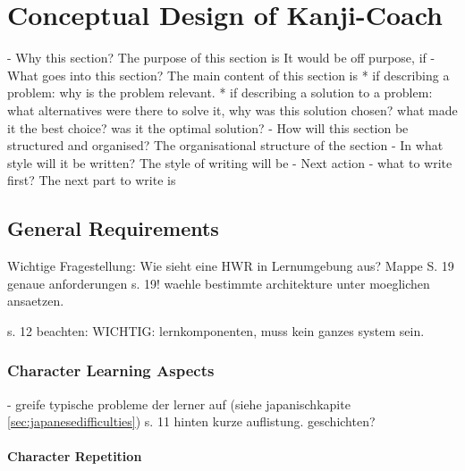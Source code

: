 
\chapter{Conceptual Design of Kanji-Coach}
\label{chap:conceptualdesignofkanjicoach}

- Why this section? 
  The purpose of this section is 
  It would be off purpose, if 
- What goes into this section?
  The main content of this section is 
  * if describing a problem: why is the problem relevant.
  * if describing a solution to a problem: what alternatives were
    there to solve it, why was this solution chosen? 
    what made it the best choice? was it the optimal solution?
- How will this section be structured and organised?
  The organisational structure of the section 
- In what style will it be written?
  The style of writing will be 
- Next action - what to write first?
  The next part to write is


\section{General Requirements}
\label{sec:concept:generalrequirements}

Wichtige Fragestellung: Wie sieht eine HWR in Lernumgebung aus?
Mappe S. 19
genaue anforderungen s. 19!
waehle bestimmte architekture unter moeglichen ansaetzen.

s. 12 beachten: WICHTIG: lernkomponenten, muss kein ganzes system sein.



\subsection{Character Learning Aspects}
\label{sec:concept:charaterlearningaspects}


- greife typische probleme der lerner auf 
  (siehe japanischkapite \ref{sec:japanesedifficulties})
  s. 11 hinten kurze auflistung. geschichten?

\subsubsection{Character Repetition}
\label{sec:concept:characterrepetition} %


